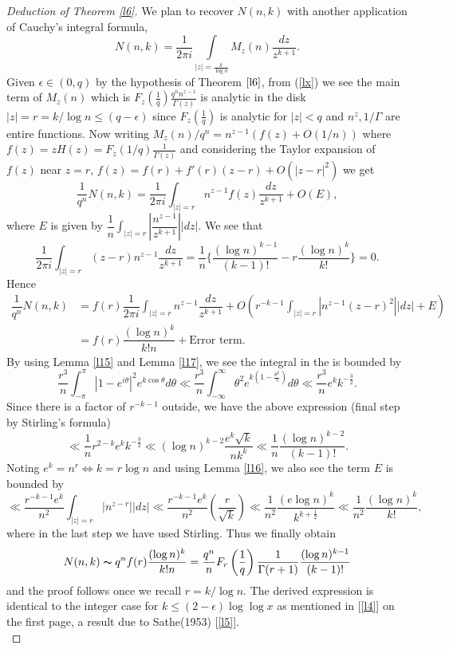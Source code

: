 \documentclass[12pt]{amsart}
\numberwithin{equation}{section}
\theoremstyle{remark}
\theoremstyle{remark}
\theoremstyle{definition}
\begin{document}
\begin{proof}[Deduction of Theorem \ref{l6}]
We plan to recover $N(n,k)$ with another application of Cauchy's integral formula, 
\begin{equation}\label{l26}
N(n,k)=\dfrac{1}{2\pi i}\displaystyle\int\limits_{|z|=\frac{k}{\log n}} M_z(n) \dfrac{dz}{z^{k+1}}.
\end{equation}
Given $\epsilon\in(0,q)$ by the hypothesis of Theorem $\ref{l6}$, from (\ref{lx}) we see the main term of $M_z(n)$ which is $F_z\left( \frac{1}{q}\right)\frac{q^nn^{z-1}}{\Gamma(z)}$ is analytic in the disk $|z|=r={k}/{\log n}\leqslant (q-\epsilon)$ since $F_z\left( \frac{1}{q}\right)$ is analytic for $|z|<q$ and $n^z, 1/\Gamma$ are entire functions. 
Now writing $M_z(n)/q^n= n^{z-1}\left(f(z)+O\left(1/n \right) \right)$ where $f(z)=zH(z)=F_z\left( 1/q\right) \frac{1}{\Gamma(z)}$ and considering the Taylor expansion of $f(z)$ near $z=r$, $f(z)=f(r)+f'(r)(z-r)+O(|z-r|^2)$ we get
\begin{equation}\label{l59}
\dfrac{1}{q^n}N(n,k)=\dfrac{1}{2\pi i}\displaystyle\int_{|z|=r}n^{z-1}f(z) \dfrac{dz}{z^{k+1}}+O(E),
\end{equation}
where $E$ is given by $\dfrac{1}{n}\displaystyle\int_{|z|=r} \left|\dfrac{n^{z-1}}{z^{k+1}}\right||dz|$. We see that
$$\dfrac{1}{2\pi i}\displaystyle\int_{|z|=r} (z-r)n^{z-1}\dfrac{dz}{z^{k+1}}=\dfrac{1}{n}\Bigg\{ \dfrac{(\log n)^{k-1}}{(k-1)!}-r \dfrac{(\log n)^k}{k!}\Bigg \}=0.$$
Hence
\begin{align}
\nonumber
\dfrac{1}{q^n}N(n,k)&= f(r)\dfrac{1}{2\pi i}\displaystyle\int_{|z|=r}n^{z-1} \dfrac{dz}{z^{k+1}}+O\left(r^{-k-1}\displaystyle\int_{|z|=r} |n^{z-1}(z-r)^2||dz| +E \right) \\
\nonumber
&=f(r)\dfrac{(\log n)^k}{k!n}+\text{Error term}.
\end{align}
By using Lemma \ref{l15} and Lemma \ref{l17}, we see the integral in the  is bounded by
$$\dfrac{r^3}{n}\displaystyle\int_{-\pi}^{\pi}|1-e^{i\theta}|^2 e^{k\cos \theta}d\theta \ll \dfrac{r^3}{n}\displaystyle\int_{-\infty}^{\infty} \theta^2 e^{k(1-\frac{\theta^2}{5})}d\theta \ll \dfrac{r^3}{n}e^k k^{-\frac{3}{2}}.$$
Since there is a factor of $r^{-k-1}$ outside, we have the above expression (final step by Stirling's formula)
$$\ll \dfrac{1}{n}r^{2-k}e^kk^{-\frac{3}{2}}\ll (\log n)^{k-2} \dfrac{e^k \sqrt{k}}{nk^k}\ll \dfrac{1}{n}\dfrac{(\log n)^{k-2}}{(k-1)!}.$$
Noting $e^k=n^r\iff k=r\log n$ and using Lemma \ref{l16}, we also see the term $E$ is bounded by
$$\ll \dfrac{r^{-k-1}e^k}{n^2}\displaystyle\int_{|z|=r} |n^{z-r}||dz|\ll \dfrac{r^{-k-1}e^k}{n^2} \left( \dfrac{r}{\sqrt{k}}\right)\ll \dfrac{1}{n^2}\dfrac{(e\log n)^k}{k^{k+\frac{1}{2}}}\ll \dfrac{1}{n^2} \dfrac{(\log n)^k}{k!},$$
where in the last step we have used Stirling. Thus we finally obtain
$$N(n,k)\thicksim q^nf(r) \dfrac{(\log n)^k}{k!n}=\dfrac{q^n}{n}F_r\left( \dfrac{1}{q}\right)\dfrac{1}{\Gamma(r+1)}\dfrac{(\log n)^{k-1}}{(k-1)!}$$
and the proof follows once we recall $r={k}/{\log n}$. The derived expression is identical to the integer case for $k\leqslant (2-\epsilon)\log \log x$ as mentioned in [\ref{l4}] on the first page, a result due to Sathe(1953) [\ref{l5}].\\
\end{proof}
\end{document}
